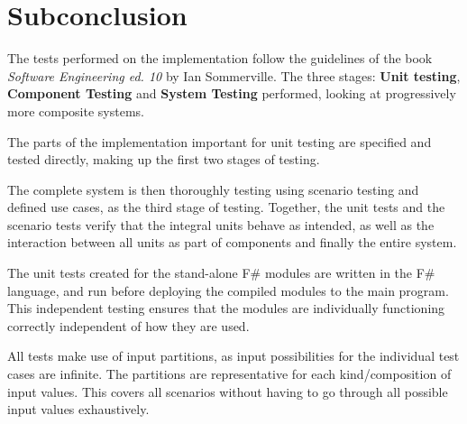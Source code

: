 \section{Subconclusion}\label{sec:Testing-Subconclusion}

The tests performed on the implementation follow the guidelines of the book \textit{Software Engineering ed.  10} by Ian Sommerville\cite{SoftwareEngineering}. The three stages: \textbf{Unit testing}, \textbf{Component Testing} and \textbf{System Testing} performed, looking at progressively more composite systems. 

The parts of the implementation important for unit testing are specified and tested directly, making up the first two stages of testing.

The complete system is then thoroughly testing using scenario testing and defined use cases, as the third stage of testing. 
Together, the unit tests and the scenario tests verify that the integral units behave as intended, as well as the interaction between all units as part of components and finally the entire system. 

The unit tests created for the stand-alone F\# modules are written in the F\# language, and run before deploying the compiled modules to the main program. This independent testing ensures that the modules are individually functioning correctly independent of how they are used.

All tests make use of input partitions, as input possibilities for the individual test cases are infinite. The partitions are representative for each kind/composition of input values. This covers all scenarios without having to go through all possible input values exhaustively. 
